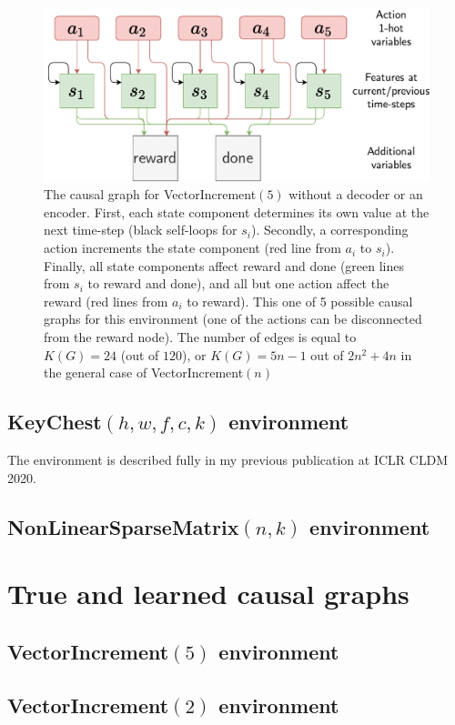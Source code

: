 \documentclass[a4paper,11pt,oneside]{report}
\begin{document}
\begin{figure}[h]
    \centering
    \includegraphics[width=0.7\linewidth]{diagrams/ve5_nodec}
    \caption{The causal graph for VectorIncrement$(5)$ without a decoder or an encoder. First, each state component determines its own value at the next time-step (black self-loops for $s_i$). Secondly, a corresponding action increments the state component (red line from $a_i$ to $s_i$). Finally, all state components affect reward and done (green lines from $s_i$ to reward and done), and all but one action affect the reward (red lines from $a_i$ to reward). This one of 5 possible causal graphs for this environment (one of the actions can be disconnected from the reward node). The number of edges is equal to $K(G)=24$ (out of $120$), or $K(G)=5n-1$ out of $2n^2+4n$ in the general case of VectorIncrement$(n)$}
    \label{fig:ve5nodec}
\end{figure}


\subsection{KeyChest$(h,w,f,c,k)$ environment}
The environment is described fully in my previous publication \cite{Volodin2020} at ICLR CLDM 2020.

\subsection{NonLinearSparseMatrix$(n,k)$ environment}

\section{True and learned causal graphs}
\subsection{VectorIncrement$(5)$ environment}
\subsection{VectorIncrement$(2)$ environment}
\end{document}
